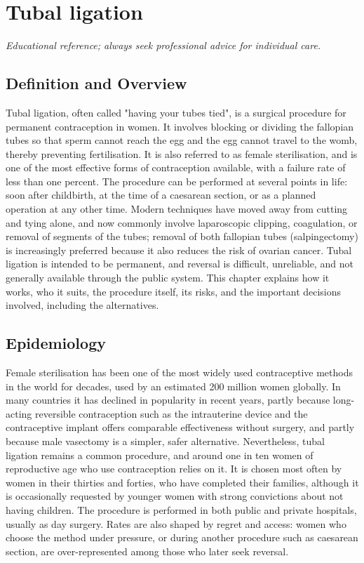 \chapter{Tubal ligation}

\medskip
\noindent\textit{Educational reference; always seek professional advice for individual care.}

\section*{Definition and Overview}
Tubal ligation, often called "having your tubes tied", is a surgical procedure for permanent contraception in women. It involves blocking or dividing the fallopian tubes so that sperm cannot reach the egg and the egg cannot travel to the womb, thereby preventing fertilisation. It is also referred to as female sterilisation, and is one of the most effective forms of contraception available, with a failure rate of less than one percent. The procedure can be performed at several points in life: soon after childbirth, at the time of a caesarean section, or as a planned operation at any other time. Modern techniques have moved away from cutting and tying alone, and now commonly involve laparoscopic clipping, coagulation, or removal of segments of the tubes; removal of both fallopian tubes (salpingectomy) is increasingly preferred because it also reduces the risk of ovarian cancer. Tubal ligation is intended to be permanent, and reversal is difficult, unreliable, and not generally available through the public system. This chapter explains how it works, who it suits, the procedure itself, its risks, and the important decisions involved, including the alternatives.

\section*{Epidemiology}
Female sterilisation has been one of the most widely used contraceptive methods in the world for decades, used by an estimated 200 million women globally. In many countries it has declined in popularity in recent years, partly because long-acting reversible contraception such as the intrauterine device and the contraceptive implant offers comparable effectiveness without surgery, and partly because male vasectomy is a simpler, safer alternative. Nevertheless, tubal ligation remains a common procedure, and around one in ten women of reproductive age who use contraception relies on it. It is chosen most often by women in their thirties and forties, who have completed their families, although it is occasionally requested by younger women with strong convictions about not having children. The procedure is performed in both public and private hospitals, usually as day surgery. Rates are also shaped by regret and access: women who choose the method under pressure, or during another procedure such as caesarean section, are over-represented among those who later seek reversal.

